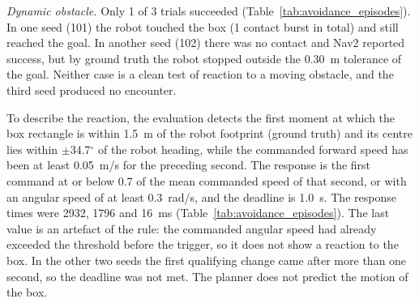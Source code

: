 \noindent\textit{Dynamic obstacle.} Only 1 of 3 trials succeeded (Table~\ref{tab:avoidance_episodes}). In one seed (101) the robot touched the box (1 contact burst in total) and still reached the goal. In another seed (102) there was no contact and Nav2 reported success, but by ground truth the robot stopped outside the 0.30~m tolerance of the goal. Neither case is a clean test of reaction to a moving obstacle, and the third seed produced no encounter.

To describe the reaction, the evaluation detects the first moment at which the box rectangle is within 1.5~m of the robot footprint (ground truth) and its centre lies within $\pm$34.7$^{\circ}$ of the robot heading, while the commanded forward speed has been at least 0.05~m/s for the preceding second. The response is the first command at or below 0.7 of the mean commanded speed of that second, or with an angular speed of at least 0.3~rad/s, and the deadline is 1.0~s. The response times were 2932, 1796 and 16~ms (Table~\ref{tab:avoidance_episodes}). The last value is an artefact of the rule: the commanded angular speed had already exceeded the threshold before the trigger, so it does not show a reaction to the box. In the other two seeds the first qualifying change came after more than one second, so the deadline was not met. The planner does not predict the motion of the box.

\begin{table}[htbp]
\centering
\caption{Per-episode results of the dynamic scenario and the static trap.}
\label{tab:avoidance_episodes}
\small
{}
\end{table}


